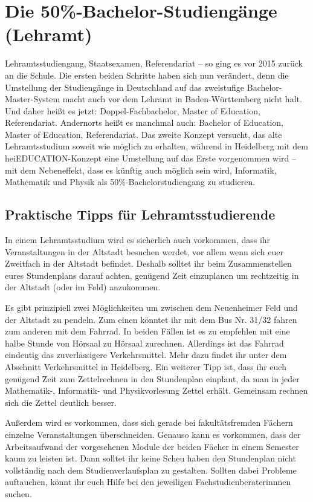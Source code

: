 
\section{Die 50\%-Bachelor-Studiengänge (Lehramt)} %
\label{lehramt_allg}

Lehramtsstudiengang, Staatsexamen, Referendariat -- so ging es vor 2015 zurück an die Schule. Die ersten beiden Schritte haben sich nun verändert, denn die Umstellung der Studiengänge in Deutschland auf das zweistufige Bachelor-Master-System macht auch vor dem Lehramt in Baden-Württemberg nicht halt. Und daher heißt es jetzt: Doppel-Fachbachelor, Master of Education, Referendariat. Andernorts heißt es manchmal auch: Bachelor of Education, Master of Education, Referendariat. Das zweite Konzept versucht, das alte Lehramtsstudium soweit wie möglich zu erhalten, während in Heidelberg mit dem heiEDUCATION-Konzept eine Umstellung auf das Erste vorgenommen wird -- mit dem Nebeneffekt, dass es künftig auch möglich sein wird, Informatik, Mathematik und Physik als 50\%-Bachelorstudiengang zu studieren.

\subsection{Praktische Tipps für Lehramtsstudierende}
In einem Lehramtsstudium wird es sicherlich auch vorkommen, dass ihr Veranstaltungen in der Altstadt besuchen werdet, vor allem wenn sich euer Zweitfach in der Altstadt befindet. Deshalb solltet ihr beim Zusammenstellen eures Stundenplans darauf achten, genügend Zeit einzuplanen um rechtzeitig in der Altstadt (oder im Feld) anzukommen.

Es gibt prinzipiell zwei Möglichkeiten um zwischen dem Neuenheimer Feld und der Altstadt zu pendeln. Zum einen könntet ihr mit dem Bus Nr. 31/32  fahren zum anderen mit dem Fahrrad. In beiden Fällen ist es zu empfehlen mit eine halbe Stunde von Hörsaal zu Hörsaal zurechnen. Allerdings ist das Fahrrad eindeutig das zuverlässigere Verkehrsmittel. Mehr dazu findet ihr unter dem Abschnitt Verkehrsmittel in Heidelberg. 
Ein weiterer Tipp ist, dass ihr euch genügend Zeit zum Zettelrechnen in den Stundenplan einplant, da man in jeder Mathematik-, Informatik- und Physikvorlesung Zettel erhält. Gemeinsam rechnen sich die Zettel deutlich besser. 

Außerdem wird es vorkommen, dass sich gerade bei fakultätsfremden Fächern einzelne Veranstaltungen überschneiden. Genauso kann es vorkommen, dass der Arbeitsaufwand der vorgesehenen Module der beiden Fächer in einem Semester kaum zu leisten ist. Dann solltet ihr keine Scheu haben den Stundenplan nicht vollständig nach dem Studienverlaufsplan zu gestalten. Sollten dabei Probleme auftauchen, könnt ihr euch Hilfe bei den jeweiligen Fachstudienberaterinnnen suchen.


